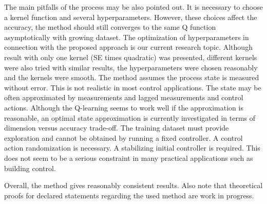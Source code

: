 \documentclass{ifacconf}
\begin{document}
The main pitfalls of the process may be also pointed out. It is necessary
to choose a kernel function and several hyperparameters. However, these
choices affect the accuracy, the method should still converges to
the same Q function asymptotically with growing dataset. The optimization
of hyperparameters in connection with the proposed approach is our
current research topic. Although result with only one kernel (SE times
quadratic) was presented, different kernels were also tried with similar
results, the hyperparameters were chosen reasonably and the kernels
were smooth. The method assumes the process state is measured without
error. This is not realistic in most control applications. The state
may be often approximated by measurements and lagged measurements
and control actions. Although the Q-learning seems to work well if
the approximation is reasonable, an optimal state approximation is
currently investigated in terms of dimension versus accuracy trade-off.
The training dataset must provide exploration and cannot be obtained
by running a fixed controller. A control action randomization is necessary.
A stabilizing initial controller is required. This does not seem to
be a serious constraint in many practical applications such as building
control. 

Overall, the method gives reasonably consistent results. Also note
that theoretical proofs for declared statements regarding the used
method are work in progress. 


\end{document}
